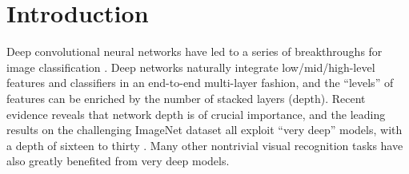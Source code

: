 \documentclass[10pt,twocolumn,letterpaper]{article}
\begin{document}



\vspace{-1em}
\section{Introduction}
\label{sec:intro}

Deep convolutional neural networks \cite{LeCun1989,Krizhevsky2012} have led to a series of breakthroughs for image classification \cite{Krizhevsky2012,Zeiler2014,Sermanet2014}. Deep networks naturally integrate low/mid/high-level features \cite{Zeiler2014} and classifiers in an end-to-end multi-layer fashion, and the ``levels'' of features can be enriched by the number of stacked layers (depth).
Recent evidence \cite{Simonyan2015,Szegedy2015} reveals that network depth is of crucial importance, and the leading results \cite{Simonyan2015,Szegedy2015,He2015,Ioffe2015} on the challenging ImageNet dataset \cite{Russakovsky2014} all exploit ``very deep'' \cite{Simonyan2015} models, with a depth of sixteen \cite{Simonyan2015} to thirty \cite{Ioffe2015}. Many other nontrivial visual recognition tasks \cite{Girshick2014,He2014,Girshick2015,Ren2015,Long2015} have also greatly benefited from very deep models.
\end{document}
